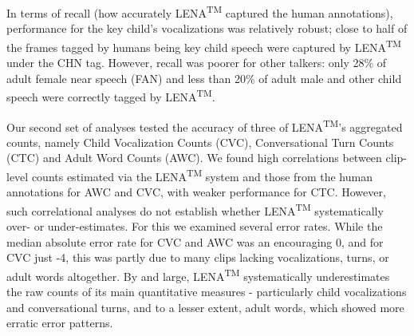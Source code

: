 \documentclass[english,table,man,floatsintext]{apa6}
\begin{document}
In terms of recall (how accurately LENA\textsuperscript{TM} captured the human annotations), performance for the key child's vocalizations was relatively robust; close to half of the frames tagged by humans being key child speech were captured by LENA\textsuperscript{TM} under the CHN tag. However, recall was poorer for other talkers: only 28\% of adult female near speech (FAN) and less than 20\% of adult male and other child speech were correctly tagged by LENA\textsuperscript{TM}.

Our second set of analyses tested the accuracy of three of LENA\textsuperscript{TM}'s aggregated counts, namely Child Vocalization Counts (CVC), Conversational Turn Counts (CTC) and Adult Word Counts (AWC). We found high correlations between clip-level counts estimated via the LENA\textsuperscript{TM} system and those from the human annotations for AWC and CVC, with weaker performance for CTC. However, such correlational analyses do not establish whether LENA\textsuperscript{TM} systematically over- or under-estimates. For this we examined several error rates. While the median absolute error rate for CVC and AWC was an encouraging 0, and for CVC just -4, this was partly due to many clips lacking vocalizations, turns, or adult words altogether. By and large, LENA\textsuperscript{TM} systematically underestimates the raw counts of its main quantitative measures - particularly child vocalizations and conversational turns, and to a lesser extent, adult words, which showed more erratic error patterns.
\end{document}

